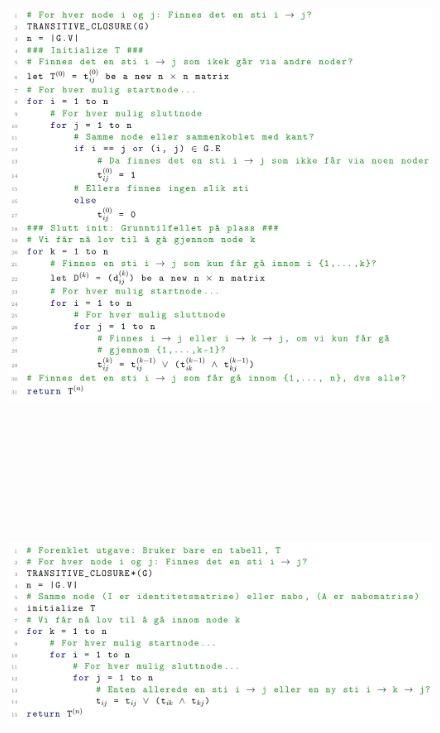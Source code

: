 \documentclass[12pt]{report}
\begin{document}
\begin{figure}[H]
	\begin{Center}
		\includegraphics[width=6.3in,height=5.84in]{./media/image201.png}
	\end{Center}
\end{figure}



\par


\vspace{\baselineskip}



\begin{figure}[H]
	\begin{Center}
		\includegraphics[width=6.3in,height=2.72in]{./media/image202.png}
	\end{Center}
\end{figure}
\end{document}
